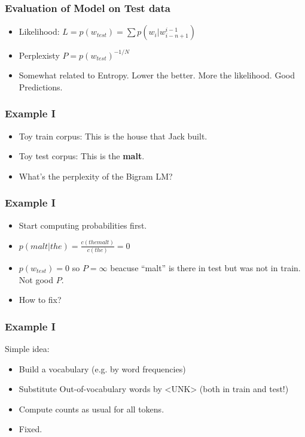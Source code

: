 \begin{frame}[fragile]
  \frametitle{Evaluation of Model on Test data}
  \begin{itemize}
  \item  Likelihood: $L =  p (w_{test}) = \sum p (w_i | w^{i-1}_{i-n+1}) $
  \item Perplexisty $P = p (w_{test})^{- 1/N}$
  \item Somewhat related to Entropy. Lower the better. More the likelihood. Good Predictions.
  	  \end{itemize}
  	  
 \end{frame} 
 
\begin{frame}[fragile]
  \frametitle{Example I}
  \begin{itemize}
  \item Toy train corpus:
This is the house that Jack built.
\item Toy test corpus:
This is the \textbf{malt}.
\item What's the perplexity of the Bigram LM?
  	  \end{itemize}
  	  
 \end{frame} 

 
\begin{frame}[fragile]
  \frametitle{Example I}
  \begin{itemize}
  \item Start computing probabilities first.
  \item $p(malt | the) = \frac{c(the malt)}{c(the)} = 0$
  \item $p(w_{test} ) = 0$ so $P = \infty$ beacuse ``malt'' is there in test but was not in train. Not good $P$.
  \item How to fix?
  	  \end{itemize}
  	  
 \end{frame} 
 
\begin{frame}[fragile]
  \frametitle{Example I}
  Simple idea:
  \begin{itemize}
  \item Build a vocabulary (e.g. by word frequencies)
  \item Substitute Out-of-vocabulary words by $\text{<UNK>}$  (both in train and test!)
  \item Compute counts as usual for all tokens.
  \item Fixed.
  	  \end{itemize}
  	  
 \end{frame} 


